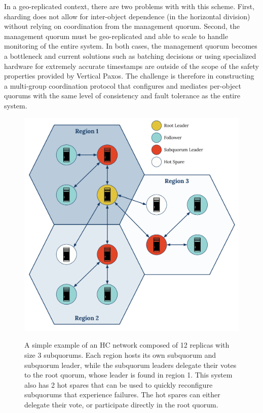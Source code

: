 In a geo-replicated context, there are two problems with with this scheme.
First, sharding does not allow for inter-object dependence (in the horizontal division) without relying on coordination from the management quorum.
Second, the management quorum must be geo-replicated and able to scale to handle monitoring of the entire system.
In both cases, the management quorum becomes a bottleneck and current solutions such as batching decisions or using specialized hardware for extremely accurate timestamps are outside of the scope of the safety properties provided by Vertical Paxos.
The challenge is therefore in constructing a multi-group coordination protocol that configures and mediates per-object quorums with the same level of consistency and fault tolerance as the entire system.

\begin{figure}
    \begin{center}
        \includegraphics[width=5in]{figures/ch03_hierarchical_topology.pdf}
    \end{center}
    \renewcommand{\baselinestretch}{1}
    \small\normalsize

    \begin{quote}
        \caption[A 12x3 Hierarchical Consensus Network Topology]{A simple example of an HC network composed of 12 replicas with size 3 subquorums. Each region hosts its own subquorum and subquorum leader, while the subquorum leaders delegate their votes to the root quorum, whose leader is found in region 1. This system also has 2 hot spares that can be used to quickly reconfigure subquorums that experience failures. The hot spares can either delegate their vote, or participate directly in the root quorum.}
        \label{fig:ch03_hierarchical_topology}
    \end{quote}
\end{figure}
\renewcommand{\baselinestretch}{2}
\small\normalsize

